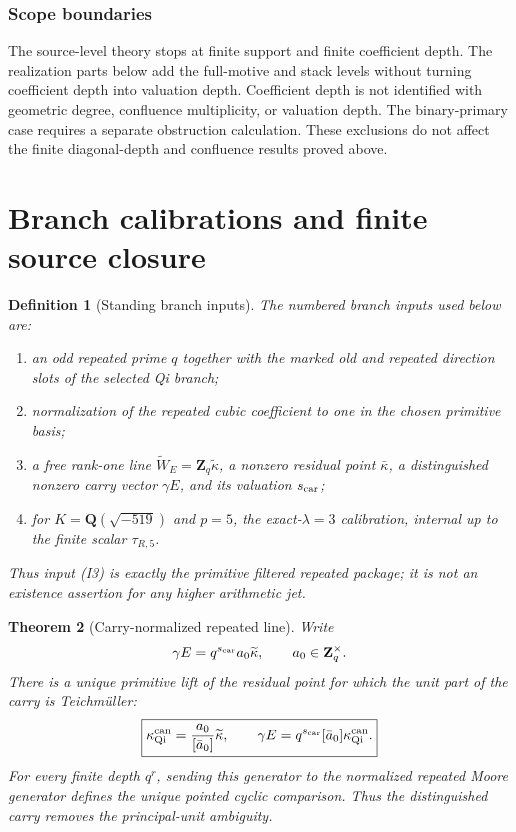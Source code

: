 \documentclass[11pt]{article}
\newtheorem{theorem}{Theorem}[section]
\newtheorem{definition}[theorem]{Definition}
\theoremstyle{remark}
\newcommand{\Z}{\mathbf Z}
\providecommand{\Q}{\mathbf Q}
\begin{document}
\subsubsection{Scope boundaries}

The source-level theory stops at finite support and finite coefficient depth.  The
realization parts below add the full-motive and stack levels without turning
coefficient depth into valuation depth.  Coefficient depth is not identified
with geometric degree, confluence multiplicity, or valuation depth.  The
binary-primary case requires a separate obstruction calculation.  These exclusions
do not affect the finite diagonal-depth and confluence results proved above.
\section{Branch calibrations and finite source closure}
\label{P1L-sec:hierarchy}

\begin{definition}[Standing branch inputs]
\label{P1C-def:imported-hypotheses}
The numbered branch inputs used below are:
\begin{enumerate}[label=\textup{(I\arabic*)}]
\item an odd repeated prime \(q\) together with the marked old and repeated
      direction slots of the selected Qi branch;
\item normalization of the repeated cubic coefficient to one in the chosen
      primitive basis;
\item\label{P1C-input:I3} a free rank-one line
      \(\widetilde W_E=\Z_q\widetilde\kappa\), a nonzero residual point
      \(\bar\kappa\), a distinguished nonzero carry vector \(\gamma E\), and
      its valuation \(s_{\rm car}\);
\item for \(K=\Q(\sqrt{-519})\) and \(p=5\), the exact-\(\lambda=3\)
      calibration, internal up to the finite scalar \(\tau_{R,5}\).
\end{enumerate}
Thus input \textup{(I3)} is exactly the primitive filtered repeated package;
it is not an existence assertion for any higher arithmetic jet.
\end{definition}

\begin{theorem}[Carry-normalized repeated line]
\label{P1C-thm:qi-carry-comparison-package}
Write
\[
 \gamma E=q^{s_{\rm car}}a_0\widetilde\kappa,
 \qquad a_0\in\Z_q^\times .
\]
There is a unique primitive lift of the residual point for which the unit
part of the carry is Teichm\"uller:
\[
 \boxed{
 \kappa_{\rm Qi}^{\rm can}
 =\frac{a_0}{[\bar a_0]}\widetilde\kappa,
 \qquad
 \gamma E=q^{s_{\rm car}}[\bar a_0]\kappa_{\rm Qi}^{\rm can}.}
\]
For every finite depth \(q^r\), sending this generator to the normalized
repeated Moore generator defines the unique pointed cyclic comparison.  Thus
the distinguished carry removes the principal-unit ambiguity.
\end{theorem}
\end{document}
